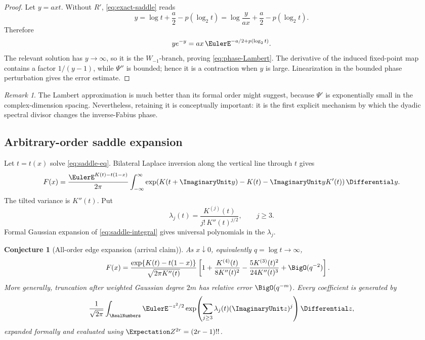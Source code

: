 \documentclass[11pt,oneside]{article}
\newtheorem{conjecture}[theorem]{Conjecture}
\theoremstyle{definition}
\theoremstyle{remark}
\newtheorem{remark}[theorem]{Remark}
\begin{document}
\begin{proof}
Let \(y=axt\).  Without \(R'\), \eqref{eq:exact-saddle} reads
\[
 y=\log t+\frac a2-p(\log_2t)
   =\log\frac{y}{ax}+\frac a2-p(\log_2t).
\]
Therefore
\[
 ye^{-y}=ax\,\EulerE^{-a/2+p(\log_2t)}.
\]
The relevant solution has \(y\to\infty\), so it is the
\(W_{-1}\)-branch, proving \eqref{eq:phase-Lambert}.  The derivative of
the induced fixed-point map contains a factor \(1/(y-1)\), while
\(\Psi''\) is bounded; hence it is a contraction when \(y\) is large.
Linearization in the bounded phase perturbation gives the error estimate.
\end{proof}

\begin{remark}
The Lambert approximation is much better than its formal order might suggest,
because \(\Psi'\) is exponentially small in the complex-dimension spacing.
Nevertheless, retaining it is conceptually important: it is the first
explicit mechanism by which the dyadic spectral divisor changes the
inverse-Fabius phase.
\end{remark}

\subsection{Arbitrary-order saddle expansion}

Let \(t=t(x)\) solve \eqref{eq:saddle-eq}.  Bilateral Laplace inversion along
the vertical line through \(t\) gives
\[
 F(x)
 =\frac{\EulerE^{K(t)-t(1-x)}}{2\pi}
  \int_{-\infty}^{\infty}
  \exp\!\left(
   K(t+\ImaginaryUnit y)-K(t)-\ImaginaryUnit yK'(t)
  \right)\Differential y.
 \label{eq:saddle-integral}
\]
The tilted variance is \(K''(t)\).  Put
\[
 \lambda_j(t)=
 \frac{K^{(j)}(t)}{j!\,K''(t)^{j/2}},
 \qquad j\geq3.
\]
Formal Gaussian expansion of \eqref{eq:saddle-integral} gives universal
polynomials in the \(\lambda_j\).

\begin{conjecture}[All-order edge expansion (arrival claim)]
\label{thm:all-order-saddle}
As \(x\downarrow0\), equivalently \(q=\log t\to\infty\),
\begin{align}
 F(x)
 ={}&
 \frac{\exp\{K(t)-t(1-x)\}}
      {\sqrt{2\pi K''(t)}}
 \left[
  1+
  \frac{K^{(4)}(t)}{8K''(t)^2}
  -\frac{5K^{(3)}(t)^2}{24K''(t)^3}
  +\BigO(q^{-2})
 \right].
 \label{eq:first-saddle-correction}
\end{align}
More generally, truncation after weighted Gaussian degree \(2m\) has
relative error \(\BigO(q^{-m})\).  Every coefficient is generated by
\begin{equation}
 \frac1{\sqrt{2\pi}}
 \int_{\RealNumbers}\EulerE^{-z^2/2}
 \exp\!\left(
  \sum_{j\geq3}\lambda_j(t)(\ImaginaryUnit z)^j
 \right)\Differential z,
 \label{eq:Gaussian-generator}
\end{equation}
expanded formally and evaluated using
\(\Expectation Z^{2r}=(2r-1)!!\).
\end{conjecture}
\end{document}
